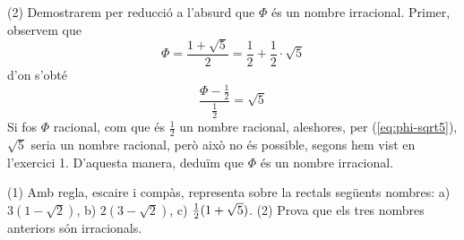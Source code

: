 \begin{solucio}
(2) Demostrarem per reducció a l’absurd que $\Phi$ és un nombre
irracional. Primer, observem que 
\begin{equation*}
\Phi =\frac{1+\sqrt{5}}{2}=\frac{1}{2}+\frac{1}{2}\cdot \sqrt{5}
\end{equation*}%
d’on s’obté%
\begin{equation}
\frac{\Phi -\frac{1}{2}}{\frac{1}{2}}=\sqrt{5}  \label{eq:phi-sqrt5}
\end{equation}%
Si fos $\Phi$ racional, com que és $\frac{1}{2}$ un nombre racional,
aleshores, per (\ref{eq:phi-sqrt5}), $\sqrt{5}$ seria un nombre racional,
però això no és possible, segons hem vist en l’exercici 1. D’aquesta
manera, deduïm que $\Phi$ és un nombre irracional.
\end{solucio}

\begin{exercici}
(1) Amb regla, escaire i compàs, representa sobre la rectals
següents nombres: a) $3(1-\sqrt{2})$, b) $2(3-\sqrt{2})$, c) $\frac{1}{%
2}(1+\sqrt{5})$. (2) Prova que els tres nombres anteriors són
irracionals.

\end{exercici}

